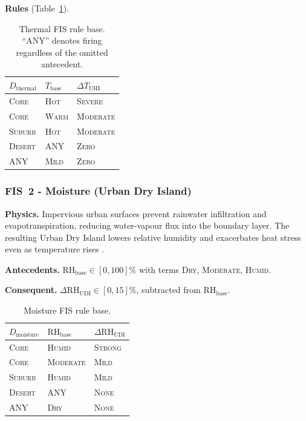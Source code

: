 \documentclass[conference]{IEEEtran}
\begin{document}
\textbf{Rules} (Table~\ref{tab:rules_thermal}).

\begin{table}[!h]
\centering
\caption{Thermal FIS rule base.  ``ANY'' denotes firing regardless of the
omitted antecedent.}
\label{tab:rules_thermal}
\small
\begin{tabular}{@{}lll@{}}
  \toprule
  \(D_{\mathrm{thermal}}\) & \(T_{\mathrm{base}}\) & \(\Delta T_{\mathrm{UHI}}\) \\
  \midrule
  \textsc{Core}   & \textsc{Hot}  & \textsc{Severe}   \\
  \textsc{Core}   & \textsc{Warm} & \textsc{Moderate} \\
  \textsc{Suburb} & \textsc{Hot}  & \textsc{Moderate} \\
  \textsc{Desert} & ANY           & \textsc{Zero}     \\
  ANY             & \textsc{Mild} & \textsc{Zero}     \\
  \bottomrule
\end{tabular}
\end{table}

\subsubsection{FIS~2 - Moisture (Urban Dry Island)}

\textbf{Physics.}  Impervious urban surfaces prevent rainwater
infiltration and evapotranspiration, reducing water-vapour flux into the
boundary layer.  The resulting Urban Dry Island lowers relative humidity
and exacerbates heat stress even as temperature rises
\cite{oke2017urban}.

\textbf{Antecedents.}  \(\mathrm{RH}_{\mathrm{base}}\in[0,100]\%\) with
terms \textsc{Dry}, \textsc{Moderate}, \textsc{Humid}.

\textbf{Consequent.}  \(\Delta\mathrm{RH}_{\mathrm{UDI}}\in[0,15]\%\),
subtracted from \(\mathrm{RH}_{\mathrm{base}}\).

\begin{table}[!h]
\centering
\caption{Moisture FIS rule base.}
\label{tab:rules_moisture}
\small
\begin{tabular}{@{}lll@{}}
  \toprule
  \(D_{\mathrm{moisture}}\) & \(\mathrm{RH}_{\mathrm{base}}\) & \(\Delta\mathrm{RH}_{\mathrm{UDI}}\) \\
  \midrule
  \textsc{Core}   & \textsc{Humid}    & \textsc{Strong} \\
  \textsc{Core}   & \textsc{Moderate} & \textsc{Mild}   \\
  \textsc{Suburb} & \textsc{Humid}    & \textsc{Mild}   \\
  \textsc{Desert} & ANY               & \textsc{None}   \\
  ANY             & \textsc{Dry}      & \textsc{None}   \\
  \bottomrule
\end{tabular}
\end{table}
\end{document}
